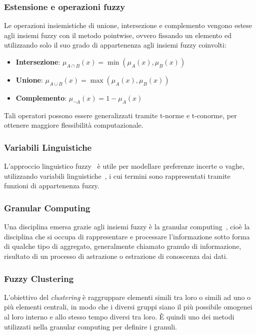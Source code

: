 \subsubsection{Estensione e operazioni fuzzy}

Le operazioni insiemistiche di unione, intersezione e complemento vengono estese agli insiemi fuzzy con il metodo pointwise, ovvero fissando un elemento ed utilizzando solo il suo grado di appartenenza agli insiemi fuzzy coinvolti:
\begin{itemize}
  \item \textbf{Intersezione}: $\mu_{A \cap B}(x) = \min(\mu_A(x), \mu_B(x))$
  \item \textbf{Unione}: $\mu_{A \cup B}(x) = \max(\mu_A(x), \mu_B(x))$
  \item \textbf{Complemento}: $\mu_{\neg A}(x) = 1 - \mu_A(x)$
\end{itemize}
Tali operatori possono essere generalizzati tramite t-norme e t-conorme, per ottenere maggiore flessibilità computazionale.

\subsubsection{Variabili Linguistiche}

L’approccio linguistico fuzzy~\cite{890332} è utile per modellare preferenze incerte o vaghe, utilizzando variabili linguistiche~\cite{ZADEH1975199}, i cui termini sono rappresentati tramite funzioni di appartenenza fuzzy.

\subsubsection{Granular Computing}
Una disciplina emersa grazie agli insiemi fuzzy è la granular computing~\cite{doi:10.1142/9789814261302_0022}, cioè la disciplina che si occupa di rappresentare e processare l’informazione sotto forma di qualche tipo di aggregato, generalmente chiamato granulo di informazione, risultato di un processo di astrazione o estrazione di conoscenza dai dati.

\subsubsection{Fuzzy Clustering}

L'obiettivo del \textit{clustering} è raggruppare elementi simili tra loro o simili ad uno o 
più elementi centrali, in modo che i diversi gruppi siano il più possibile 
omogenei al loro interno e allo stesso tempo diversi tra loro. È quindi uno dei  metodi utilizzati nella granular computing per definire i granuli. 

